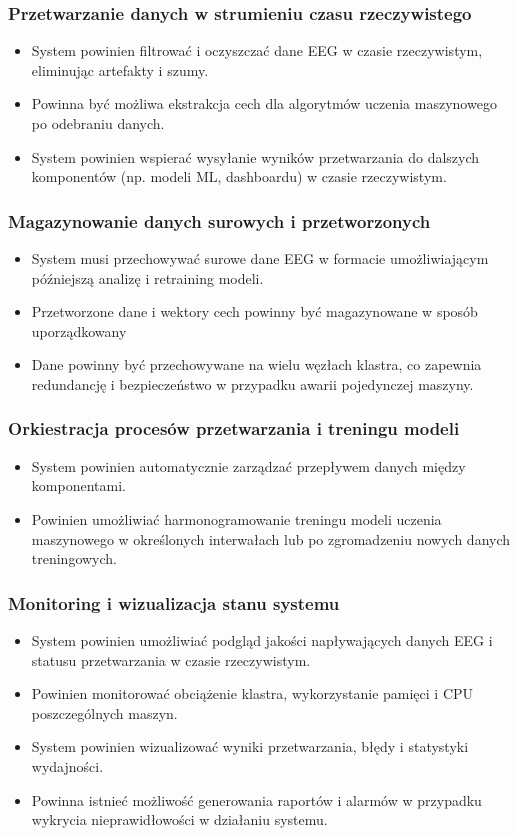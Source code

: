 \subsubsection{Przetwarzanie danych w strumieniu czasu rzeczywistego}
\begin{itemize}
    \item System powinien filtrować i oczyszczać dane EEG w czasie rzeczywistym, eliminując artefakty i szumy.
    \item Powinna być możliwa ekstrakcja cech dla algorytmów uczenia maszynowego po odebraniu danych.
    \item System powinien wspierać wysyłanie wyników przetwarzania do dalszych komponentów (np. modeli ML, dashboardu) w czasie rzeczywistym.
\end{itemize}
\subsubsection{Magazynowanie danych surowych i przetworzonych}
\begin{itemize}
    \item System musi przechowywać surowe dane EEG w formacie umożliwiającym późniejszą analizę i retraining modeli.
    \item Przetworzone dane i wektory cech powinny być magazynowane w sposób uporządkowany 
    \item Dane powinny być przechowywane na wielu węzłach klastra, co zapewnia redundancję i bezpieczeństwo w przypadku awarii pojedynczej maszyny.
\end{itemize}
\subsubsection{Orkiestracja procesów przetwarzania i treningu modeli}
\begin{itemize}
    \item System powinien automatycznie zarządzać przepływem danych między komponentami.
    \item Powinien umożliwiać harmonogramowanie treningu modeli uczenia maszynowego w określonych interwałach lub po zgromadzeniu nowych danych treningowych.
\end{itemize}
\subsubsection{Monitoring i wizualizacja stanu systemu}
\begin{itemize}
    \item System powinien umożliwiać podgląd jakości napływających danych EEG i statusu przetwarzania w czasie rzeczywistym.
    \item Powinien monitorować obciążenie klastra, wykorzystanie pamięci i CPU poszczególnych maszyn.
    \item System powinien wizualizować wyniki przetwarzania, błędy i statystyki wydajności.
    \item Powinna istnieć możliwość generowania raportów i alarmów w przypadku wykrycia nieprawidłowości w działaniu systemu.
\end{itemize}
